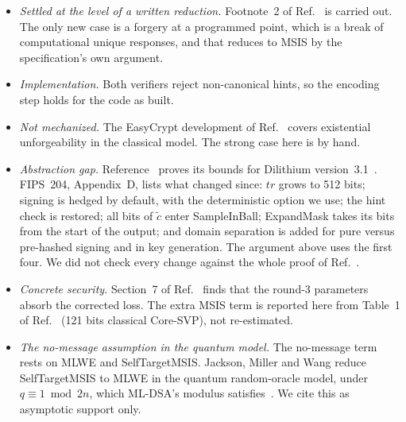 \documentclass[aps,prx,reprint,superscriptaddress,nofootinbib,floatfix]{revtex4-2}
\theoremstyle{remark}
\begin{document}
\begin{itemize}
\item \emph{Settled at the level of a written reduction.} Footnote~2 of Ref.~\cite{fsa-fix} is carried out. The only new case is a forgery at a programmed point, which is a break of computational unique responses, and that reduces to MSIS by the specification's own argument.
\item \emph{Implementation.} Both verifiers reject non-canonical hints, so the encoding step holds for the code as built.
\item \emph{Not mechanized.} The EasyCrypt development of Ref.~\cite{fsa-fix} covers existential unforgeability in the classical model. The strong case here is by hand.
\item \emph{Abstraction gap.} Reference~\cite{fsa-fix} proves its bounds for Dilithium version~3.1~\cite{dilithium}. FIPS~204, Appendix~D, lists what changed since: $\mathit{tr}$ grows to 512 bits; signing is hedged by default, with the deterministic option we use; the hint check is restored; all bits of $\tilde c$ enter SampleInBall; ExpandMask takes its bits from the start of the output; and domain separation is added for pure versus pre-hashed signing and in key generation. The argument above uses the first four. We did not check every change against the whole proof of Ref.~\cite{fsa-fix}.
\item \emph{Concrete security.} Section~7 of Ref.~\cite{fsa-fix} finds that the round-3 parameters absorb the corrected loss. The extra MSIS term is reported here from Table~1 of Ref.~\cite{dilithium} (121 bits classical Core-SVP), not re-estimated.
\item \emph{The no-message assumption in the quantum model.} The no-message term rests on MLWE and SelfTargetMSIS. Jackson, Miller and Wang reduce SelfTargetMSIS to MLWE in the quantum random-oracle model, under $q\equiv1\bmod 2n$, which ML-DSA's modulus satisfies~\cite{jmw}. We cite this as asymptotic support only.
\end{itemize}
\end{document}
